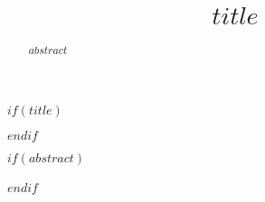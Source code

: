 
\begin{frontmatter}

$if(title)$
\title{$title$}
$endif$

$if(abstract)$
\begin{abstract}
$abstract$
\end{abstract}
$endif$\

\end{frontmatter}
